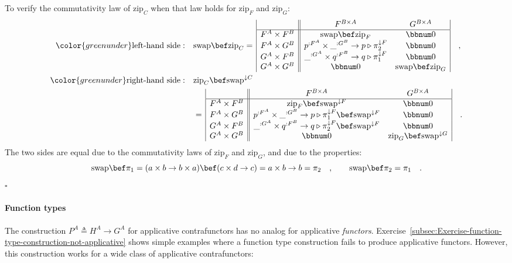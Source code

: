 To verify the commutativity law of $\text{zip}_{C}$ when that law
holds for $\text{zip}_{F}$ and $\text{zip}_{G}$:
\begin{align*}
{\color{greenunder}\text{left-hand side}:}\quad & \text{swap}\bef\text{zip}_{C}=\,\begin{array}{|c||cc|}
 & F^{B\times A} & G^{B\times A}\\
\hline F^{A}\times F^{B} & \text{swap}\bef\text{zip}_{F} & \bbnum 0\\
F^{A}\times G^{B} & p^{:F^{A}}\times\_^{:G^{B}}\rightarrow p\triangleright\pi_{2}^{\downarrow F} & \bbnum 0\\
G^{A}\times F^{B} & \_^{:G^{A}}\times q^{:F^{B}}\rightarrow q\triangleright\pi_{1}^{\downarrow F} & \bbnum 0\\
G^{A}\times G^{B} & \bbnum 0 & \text{swap}\bef\text{zip}_{G}
\end{array}\quad,\\
{\color{greenunder}\text{right-hand side}:}\quad & \text{zip}_{C}\bef\text{swap}^{\downarrow C}\\
 & =\,\begin{array}{|c||cc|}
 & F^{B\times A} & G^{B\times A}\\
\hline F^{A}\times F^{B} & \text{zip}_{F}\bef\text{swap}^{\downarrow F} & \bbnum 0\\
F^{A}\times G^{B} & p^{:F^{A}}\times\_^{:G^{B}}\rightarrow p\triangleright\pi_{1}^{\downarrow F}\bef\text{swap}^{\downarrow F} & \bbnum 0\\
G^{A}\times F^{B} & \_^{:G^{A}}\times q^{:F^{B}}\rightarrow q\triangleright\pi_{2}^{\downarrow F}\bef\text{swap}^{\downarrow F} & \bbnum 0\\
G^{A}\times G^{B} & \bbnum 0 & \text{zip}_{G}\bef\text{swap}^{\downarrow G}
\end{array}\quad.
\end{align*}
The two sides are equal due to the commutativity laws of $\text{zip}_{F}$
and $\text{zip}_{G}$, and due to the properties:
\[
\text{swap}\bef\pi_{1}=(a\times b\rightarrow b\times a)\bef(c\times d\rightarrow c)=a\times b\rightarrow b=\pi_{2}\quad,\quad\quad\text{swap}\bef\pi_{2}=\pi_{1}\quad.
\]
$\square$

\paragraph{Function types}

The construction $P^{A}\triangleq H^{A}\rightarrow G^{A}$ for applicative
contrafunctors has no analog for applicative \emph{functors}. Exercise~\ref{subsec:Exercise-function-type-construction-not-applicative}
shows simple examples where a function type construction fails to
produce applicative functors. However, this construction works for
a wide class of applicative contrafunctors:

